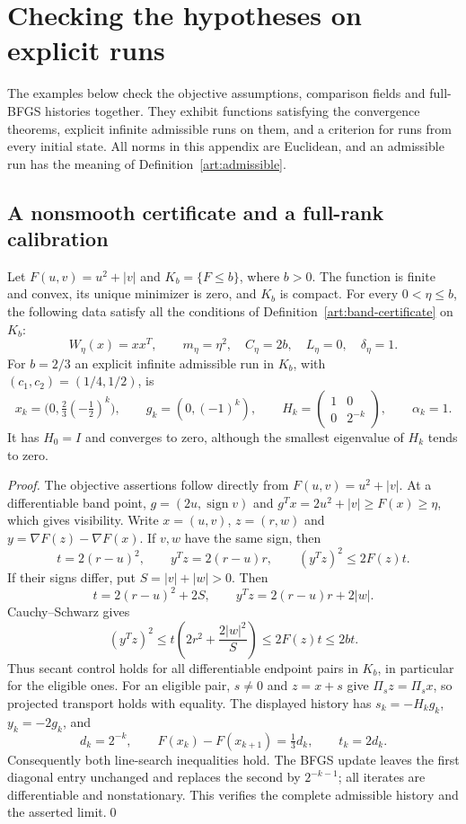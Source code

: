 \section{Checking the hypotheses on explicit runs}\label{art:hypothesis-examples}

The examples below check the objective assumptions, comparison fields and
full-BFGS histories together. They exhibit functions satisfying the
convergence theorems, explicit infinite admissible runs on them, and a
criterion for runs from every initial state. All norms in this appendix
are Euclidean, and an admissible run has the meaning of
Definition~\ref{art:admissible}.

\subsection{A nonsmooth certificate and a full-rank calibration}

\begin{proposition}\label{art:examples-mixed}
Let $F(u,v)=u^2+|v|$ and $K_b=\{F\le b\}$, where $b>0$.
The function is finite and convex, its unique minimizer is zero, and $K_b$
is compact. For every $0<\eta\le b$, the following data satisfy all the
conditions of Definition~\ref{art:band-certificate} on $K_b$:
\[
 W_\eta(x)=xx^T,\qquad m_\eta=\eta^2,\quad C_\eta=2b,
 \quad L_\eta=0,\quad\delta_\eta=1.
\]
For $b=2/3$ an explicit infinite admissible run in $K_b$, with
$(c_1,c_2)=(1/4,1/2)$, is
\[
 x_k=\bigl(0,\tfrac23(-\tfrac12)^k\bigr),\qquad
 g_k=(0,(-1)^k),\qquad
 H_k=\begin{pmatrix}1&0\\0&2^{-k}\end{pmatrix},\qquad \alpha_k=1.
\]
It has $H_0=I$ and converges to zero, although the smallest eigenvalue of
$H_k$ tends to zero.
\end{proposition}
\begin{proof}
The objective assertions follow directly from $F(u,v)=u^2+|v|$.
At a differentiable band point, $g=(2u,\operatorname{sign}v)$ and
$g^Tx=2u^2+|v|\ge F(x)\ge\eta$, which gives visibility.
Write $x=(u,v)$, $z=(r,w)$ and $y=\nabla F(z)-\nabla F(x)$.
If $v,w$ have the same sign, then
\[
 t=2(r-u)^2,\qquad y^Tz=2(r-u)r,\qquad
 (y^Tz)^2\le 2F(z)t.
\]
If their signs differ, put $S=|v|+|w|>0$. Then
\[
 t=2(r-u)^2+2S,\qquad y^Tz=2(r-u)r+2|w|.
\]
Cauchy--Schwarz gives
\[
 (y^Tz)^2\le t\left(2r^2+\frac{2|w|^2}{S}\right)
             \le 2F(z)t\le2bt.
\]
Thus secant control holds for all differentiable endpoint pairs in $K_b$,
in particular for the eligible ones. For an eligible pair, $s\ne0$ and $z=x+s$
give $\Pi_s z=\Pi_s x$, so projected transport holds with equality.
The displayed history has $s_k=-H_kg_k$, $y_k=-2g_k$, and
\[
 d_k=2^{-k},\qquad F(x_k)-F(x_{k+1})=\tfrac13d_k,
 \qquad t_k=2d_k.
\]
Consequently both line-search inequalities hold. The BFGS update leaves
the first diagonal entry unchanged and replaces the second by $2^{-k-1}$;
all iterates are differentiable and nonstationary. This verifies the
complete admissible history and the asserted limit.\qed
\end{proof}

